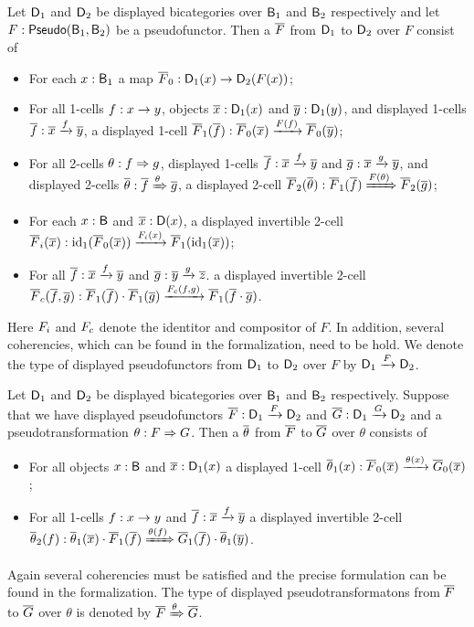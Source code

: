 \begin{definition}
Let $\D_1$ and $\D_2$ be displayed bicategories over $\B_1$ and $\B_2$ respectively and let $F : \pseudo(\B_1, \B_2)$ be a pseudofunctor.
Then a  $\FF$ from $\D_1$ to $\D_2$ over $F$ consist of
\begin{itemize}
	\item For each $x : \B_1$ a map $\FF_0 : \D_1(x) \rightarrow \D_2(F(x))$;
	\item For all 1-cells $f : x \onecell y$, objects $\xx : \D_1(x)$ and $\yy : \D_1(y)$,
	and displayed 1-cells $\ff : \dmor{\xx}{\yy}{f}$, a displayed 1-cell $\FF_1(\ff) :  \dmor{\FF_0(\xx)}{\FF_0(\yy)}{F(f)}$;
	\item For all 2-cells $\tc : f \twocell g$, displayed 1-cells $\ff : \dmor{\xx}{\yy}{f}$ and $\gg : \dmor{\xx}{\yy}{g}$,
	and displayed 2-cells $\dtc : \dtwo{\ff}{\gg}{\tc}$, a displayed 2-cell $\FF_2(\dtc) : \dtwo{\FF_1(\ff)}{\FF_2(\gg)}{F(\tc)}$;
	\item For each $x : \B$ and $\xx : \D(x)$, a displayed invertible 2-cell
	$\identitor{\FF}(\xx) : \dmor{\id_1(\FF_0(\xx))}{\FF_1(\id_1(\xx))}{\identitor{F}(x)}$;
	\item For all $\ff : \dmor{\xx}{\yy}{f}$ and $\gg : \dmor{\yy}{\zz}{g}$. a displayed invertible 2-cell
	$\compositor{\FF}(\ff, \gg) : \dmor{\FF_1(\ff) \cdot \FF_1(\gg)}{\FF_1(\ff \cdot \gg)}{\compositor{F}(f, g)}$.
\end{itemize}
Here $\identitor{F}$ and $\compositor{F}$ denote the identitor and compositor of $F$.
In addition, several coherencies, which can be found in the formalization, need to be hold.
We denote the type of displayed pseudofunctors from $\D_1$ to $\D_2$ over $F$ by $\disppsfun{\D_1}{\D_2}{F}$.
\end{definition}

\begin{definition}
Let $\D_1$ and $\D_2$ be displayed bicategories over $\B_1$ and $\B_2$ respectively.
Suppose that we have displayed pseudofunctors $\FF : \disppsfun{\D_1}{\D_2}{F}$ and $\GG : \disppsfun{\D_1}{\D_2}{G}$
and a pseudotransformation $\theta : \pstrans{F}{G}$.
Then a  $\thetatheta$ from $\FF$ to $\GG$ over $\theta$ consists of
\begin{itemize}
	\item For all objects $x : \B$ and $\xx : \D_1(x)$ a displayed 1-cell $\thetatheta_1(x) : \dmor{\FF_0(\xx)}{\GG_0(\xx)}{\theta(x)}$;
	\item For all 1-cells $f : x \onecell y$ and $\ff : \dmor{\xx}{\yy}{f}$ a displayed invertible 2-cell
	$\thetatheta_2(f) : \dtwo{\thetatheta_1(\xx) \cdot \FF_1(\ff)}{\GG_1(\ff) \cdot \thetatheta_1(\yy)}{\theta(f)}$.
\end{itemize}
Again several coherencies must be satisfied and the precise formulation can be found in the formalization.
The type of displayed pseudotransformatons from $\FF$ to $\GG$ over $\theta$ is denoted by $\disppstrans{\FF}{\GG}{\theta}$.
\end{definition}

